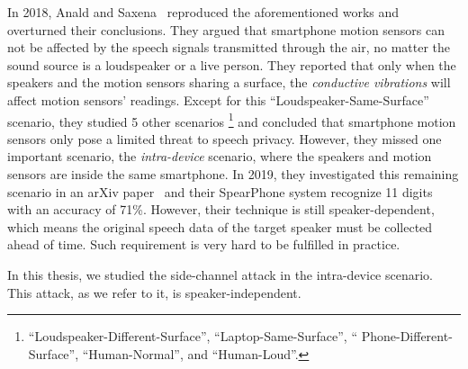 In 2018, Anald and Saxena~\cite{anand2018speechless} reproduced the aforementioned works and overturned their conclusions. They argued that smartphone motion sensors can not be affected by the speech signals transmitted through the air, no matter the sound source is a loudspeaker or a live person. They reported that only when the speakers and the motion sensors sharing a surface,  the \textit{conductive vibrations} will affect motion sensors' readings. Except for this ``Loudspeaker-Same-Surface'' scenario, they studied 5 other  scenarios
\footnote{\scriptsize``Loudspeaker-Different-Surface'', ``Laptop-Same-Surface'', `` Phone-Different-Surface'', 		``Human-Normal'', and ``Human-Loud''.}  
and concluded that smartphone motion sensors only pose a limited threat to speech privacy.
%
However, they missed one important scenario,  the \textit{intra-device} scenario, where the speakers and motion sensors are inside the same smartphone. In 2019, they investigated this remaining scenario in an arXiv paper~\cite{anand2019spearphone} and their SpearPhone system recognize 11 digits with an accuracy of 71\%.  However, their technique is still speaker-dependent, which means the original speech data of the target speaker must be collected ahead of time. Such requirement is very hard to be fulfilled in practice.

In this thesis, we studied the side-channel attack in the intra-device scenario. This \textit{{\attackName}} attack, as we refer to it, is speaker-independent.





